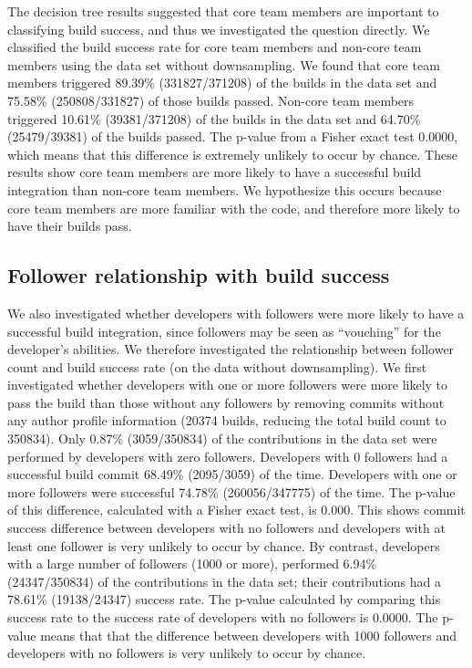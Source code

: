 \documentclass[10pt, conference]{IEEEtran}
\begin{document}
The decision tree results suggested that core team members are
important to classifying build success, and thus we investigated the question
directly. 
We classified the build success rate for
core team members and non-core team members using the data set without 
downsampling.  We found that core team members
triggered 89.39\% (331827/371208) of the builds in the data set and 75.58\%
(250808/331827) of those builds
passed.  Non-core team members triggered 10.61\% (39381/371208) of the builds 
in the data set
and 64.70\% (25479/39381) of the builds passed.  The p-value from a Fisher exact
test 0.0000, which means that this difference is extremely unlikely to occur by
chance. These results show core team 
members are more
likely to have a successful build integration than non-core team members. We
hypothesize this occurs because core team members are more familiar with the 
code, and therefore more likely to have their builds pass.



\subsection{Follower relationship with build success}
\label{sec:followerSuccess}

We also investigated whether developers with followers were more likely to have a
successful build integration, since followers may be seen as ``vouching'' for
the developer's abilities.  We therefore investigated the relationship between
follower count and build success rate (on the data without 
downsampling).  We first investigated whether developers with one or more followers
were more likely to pass the build than those without any followers by
removing commits without any author profile
information (20374 builds, reducing the total build count to
350834). Only 0.87\% (3059/350834) of the
contributions in the data set were performed by developers with zero 
followers.  %
Developers with 0 followers had a successful build commit 68.49\% (2095/3059)
of the time.  Developers with one or more followers were successful 74.78\%
(260056/347775) of the time.  The p-value of this difference, calculated with a
Fisher exact test, is 0.000.  This shows commit success difference between
developers with no followers and developers with at least one follower is
very unlikely to occur by chance.
%
By contrast, developers with a large number of followers (1000 or more),
performed 6.94\% (24347/350834) of the contributions in the 
data set; their
contributions had a 78.61\% (19138/24347) success rate. The p-value calculated
by comparing this success rate to the success rate of developers with no
followers is 0.0000.  The p-value means that that the difference between
developers with 1000 followers and developers with no followers is very unlikely
to occur by chance.
\end{document}
